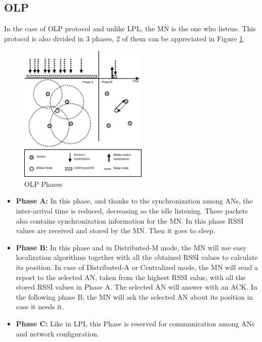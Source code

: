 \subsection{\acl{OLP}}

In the case of \ac{OLP} protocol and unlike \ac{LPL}, the \ac{MN} is the one who listens. This protocol is also divided in 3 phases, 2 of 
them can be appreciated in Figure \ref{fig:OLP}.

\begin{figure}[ht]
 \begin{center}
  \includegraphics[width=0.55\textwidth]{OLP.eps}
 \end{center}
 \caption{OLP Phases \cite{LPLandOLP}}
 \label{fig:OLP}
\end{figure}

\begin{itemize}
 \item \textbf{Phase A:} In this phase, and thanks to the synchronization among \acp{AN}, the inter-arrival time is reduced, decreasing so the
idle listening. These packets also contains synchronization information for the \ac{MN}. In this phase \ac{RSSI} values are received and stored
by the \ac{MN}. Then it goes to sleep.
 \item \textbf{Phase B:} In this phase and in Distributed-M mode, the \ac{MN} will use easy localization algorithms together with all the obtained
\ac{RSSI} values to calculate its position. In case of Distributed-A or Centralized mode, the \ac{MN} will send a report to the selected \ac{AN}, taken 
from the highest \ac{RSSI} value, with all the stored \ac{RSSI} values in Phase A. The selected \ac{AN} will answer with an \ac{ACK}. In the following
phase B, the \ac{MN} will ask the selected \ac{AN} about its position in case it needs it.
 \item \textbf{Phase C:} Like in \ac{LPL} this Phase is reserved for communication among \acp{AN} and network configuration.
\end{itemize}

